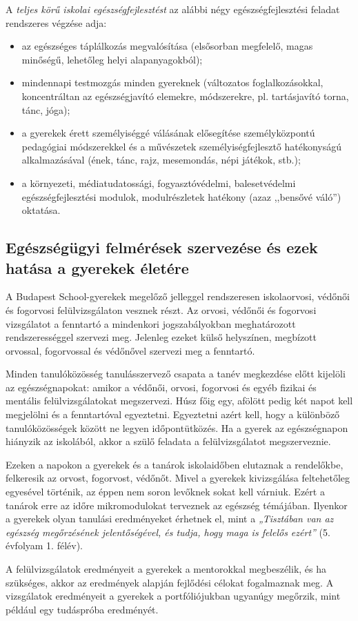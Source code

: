A \emph{teljes körű iskolai egészségfejlesztést} az alábbi négy
egészségfejlesztési feladat rendszeres végzése adja:

\begin{itemize}
\tightlist
\item
  az egészséges táplálkozás megvalósítása (elsősorban megfelelő, magas
  minőségű, lehetőleg helyi alapanyagokból);
\item
  mindennapi testmozgás minden gyereknek (változatos foglalkozásokkal,
  koncentráltan az egészségjavító elemekre, módszerekre, pl. tartásjavító
  torna, tánc, jóga);
\item
  a gyerekek érett személyiséggé válásának elősegítése személyközpontú
  pedagógiai módszerekkel és a művészetek személyiségfejlesztő
  hatékonyságú alkalmazásával (ének, tánc, rajz, mesemondás, népi
  játékok, stb.);
\item
  a környezeti, médiatudatossági, fogyasztóvédelmi, balesetvédelmi\break
  egészségfejlesztési modulok, modulrészletek hatékony (azaz
  ,,bensővé váló'') oktatása.
\end{itemize}

\hypertarget{egeszsegugyi-felmeres-szervezese-es-hatasa-a-gyerekek-eletere}{%
\subsection{Egészségügyi felmérések szervezése és ezek hatása a gyerekek
életére}\label{egeszsegugyi-felmeres-szervezese-es-hatasa-a-gyerekek-eletere}}

A Budapest School-gyerekek megelőző jelleggel rendszeresen iskolaorvosi,
védőnői és fogorvosi felülvizsgálaton vesznek részt. Az orvosi, védőnői
és fogorvosi vizsgálatot a fenntartó a mindenkori jogszabályokban
meghatározott rendszerességgel szervezi meg. Jelenleg ezeket külső
helyszínen, megbízott orvossal, fogorvossal és védőnővel szervezi meg a
fenntartó.

Minden tanulóközösség tanulásszervező csapata a tanév megkezdése előtt
kijelöli az egészségnapokat: amikor a védőnői, orvosi, fogorvosi és
egyéb fizikai és mentális felülvizsgálatokat megszervezi. Húsz főig egy,
afölött pedig két napot kell megjelölni és a fenntartóval egyeztetni.
Egyeztetni azért kell, hogy a különböző tanulóközösségek között ne
legyen időpontütközés. Ha a gyerek az egészségnapon hiányzik az
iskolából, akkor a szülő feladata a felülvizsgálatot megszerveznie.

Ezeken a napokon a gyerekek és a tanárok iskolaidőben elutaznak a
rendelőkbe, felkeresik az orvost, fogorvost, védőnőt. Mivel a gyerekek
kivizsgálása feltehetőleg egyesével történik, az éppen nem soron levőknek
sokat kell várniuk. Ezért a tanárok erre az időre
mikromodulokat terveznek az egészség témájában.  Ilyenkor a gyerekek olyan tanulási eredményeket
érhetnek el, mint a \emph{„Tisztában van az egészség megőrzésének
jelentőségével, és tudja, hogy maga is felelős ezért''} (5. évfolyam 1.
félév).

A felülvizsgálatok eredményeit a gyerekek a mentorokkal megbeszélik,
és ha szükséges, akkor az eredmények alapján fejlődési célokat
fogalmaznak meg. A vizsgálatok eredményeit a gyerekek a portfóliójukban\break
ugyanúgy megőrzik, mint például egy tudáspróba eredményét.

